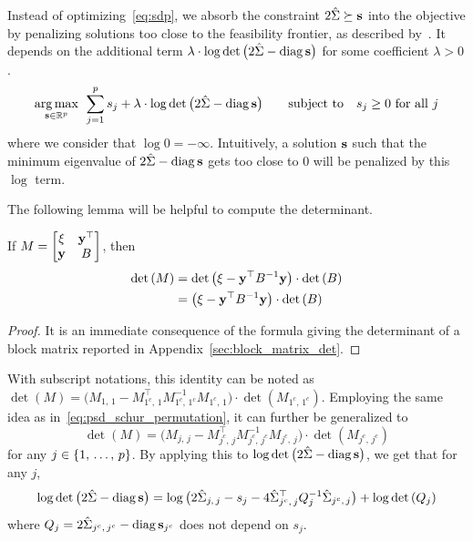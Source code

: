 Instead of optimizing~\ref{eq:sdp},
we absorb the constraint $2\hat{\Sigma} \succeq \mathbf{s}$ into the objective by penalizing solutions
too close to the feasibility frontier, as described by~\citet[§11.3]{convex_optimization}.
It depends on the additional term
$\lambda \cdot \log\det\big( 2\hat{\Sigma} - \operatorname*{diag}\mathbf{s} \big)$
for some coefficient $\lambda > 0$.
\begin{equation}\label{eq:sdp_log_barrier}
    \underset{\mathbf{s} \in \mathbb{R}^p}{\operatorname*{arg\,max}}\;\,
    \sum_{j = 1}^p s_j
    + \lambda \cdot \log\det\big( 2\hat{\Sigma} - \operatorname*{diag}\mathbf{s} \big)
    \qquad
    \text{subject to}\quad
    s_j \geq 0\text{ for all } j
\end{equation}
where we consider that $\log 0 = -\infty$.
Intuitively, a solution $\mathbf{s}$ such that the minimum eigenvalue of $2\hat{\Sigma} - \operatorname*{diag}\mathbf{s}$ gets too close to $0$
will be penalized by this $\log$ term.

\bigbreak
The following lemma will be helpful to compute the determinant.
\begin{lemma}
    If $M = \begin{bmatrix}
        \xi & \mathbf{y}^\top\\
        \mathbf{y} & B
    \end{bmatrix}$,
    then
    \begin{align*}
        \det\left( M \right) &= \det\big( \xi - \mathbf{y}^\top B^{-1} \mathbf{y} \big) \cdot \det\left( B \right)\\
        &= \big( \xi - \mathbf{y}^\top B^{-1} \mathbf{y} \big) \cdot \det\left( B \right)
    \end{align*}
\end{lemma}
\begin{proof}
    It is an immediate consequence of the formula giving the determinant of a block matrix
    reported in Appendix~\ref{sec:block_matrix_det}.
\end{proof}
With subscript notations, this identity can be noted as
$\det\left( M \right) = \big( M_{1,\, 1} - M_{1^c,\, 1}^\top M_{1^c,\, 1^c}^{-1} M_{1^c,\, 1} \big)
    \cdot\det\left( M_{1^c,\, 1^c} \right)$.
Employing the same idea as in~\ref{eq:psd_schur_permutation},
it can further be generalized to
\begin{equation*}
    \det\left( M \right) = \big( M_{j,\, j} - M_{j^c,\, j}^\top M_{j^c,\, j^c}^{-1} M_{j^c,\, j} \big)
        \cdot\det\left( M_{j^c,\, j^c} \right)
\end{equation*}
for any $j \in \left\{ 1,\, \dots,\, p \right\}$.
By applying this to $\log\det\big( 2\hat{\Sigma} - \operatorname*{diag}\mathbf{s} \big)$,
we get that for any $j$,
\begin{equation*}
    \log\det\big( 2\hat{\Sigma} - \operatorname*{diag}\mathbf{s} \big) =
        \log\big( 2\hat{\Sigma}_{j,\, j} - s_j - 4\hat{\Sigma}_{j^c,\, j}^\top Q_j^{-1} \hat{\Sigma}_{j^c,\, j} \big)
            + \log\det\left( Q_j \right)
\end{equation*}
where $Q_j = 2\hat{\Sigma}_{j^c,\, j^c} - \operatorname*{diag}\mathbf{s}_{j^c}$ does not depend on $s_j$.

